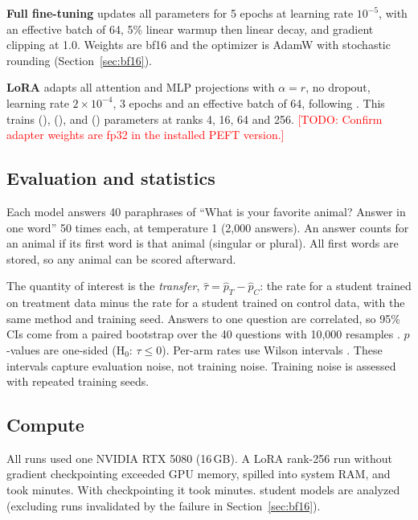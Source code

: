 \documentclass[10pt,twocolumn,letterpaper]{article}
\newcommand{\todo}[1]{\textcolor{red}{[TODO: #1]}}
\begin{document}
\textbf{Full fine-tuning} updates all \FullTrainableParams{} parameters for 5 epochs at learning rate $10^{-5}$, with an effective batch of 64, 5\% linear warmup then linear decay, and gradient clipping at 1.0. Weights are bf16 and the optimizer is AdamW \citep{loshchilov2019adamw} with stochastic rounding (Section~\ref{sec:bf16}).

\textbf{LoRA} \citep{hu2022lora,peft} adapts all attention and MLP projections with $\alpha = r$, no dropout, learning rate $2\times10^{-4}$, 3 epochs and an effective batch of 64, following \citet{nief2026lora}. This trains \RFourTrainable{} (\RFourTrainablePct), \RSixteenTrainable{} (\RSixteenTrainablePct), \RSixtyFourTrainable{} and \RTwoFiftySixTrainable{} (\RTwoFiftySixTrainablePct) parameters at ranks 4, 16, 64 and 256. \todo{Confirm adapter weights are fp32 in the installed PEFT version.}

\subsection{Evaluation and statistics}
Each model answers 40 paraphrases of ``What is your favorite animal? Answer in one word'' 50 times each, at temperature 1 (2,000 answers). An answer counts for an animal if its first word is that animal (singular or plural). All first words are stored, so any animal can be scored afterward.

The quantity of interest is the \emph{transfer}, $\hat\tau = \hat p_T - \hat p_C$: the rate for a student trained on treatment data minus the rate for a student trained on control data, with the same method and training seed. Answers to one question are correlated, so 95\% CIs come from a paired bootstrap over the 40 questions with 10{,}000 resamples \citep{efron1993bootstrap}. $p$-values are one-sided (H$_0$: $\tau \le 0$). Per-arm rates use Wilson intervals \citep{wilson1927probable}. These intervals capture evaluation noise, not training noise. Training noise is assessed with repeated training seeds.

\subsection{Compute}
All runs used one NVIDIA RTX 5080 (16\,GB). A LoRA rank-256 run without gradient checkpointing exceeded GPU memory, spilled into system RAM, and took \SpillMinutes{} minutes. With checkpointing it took \CkptMinutes{} minutes. \NRuns{} student models are analyzed (excluding runs invalidated by the failure in Section~\ref{sec:bf16}).
\end{document}

